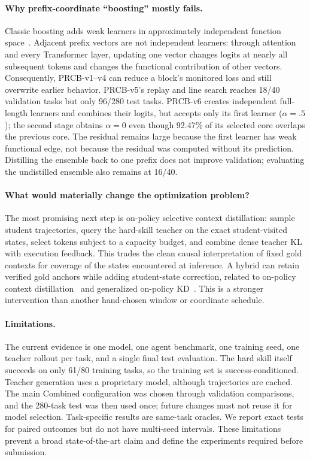 \paragraph{Why prefix-coordinate ``boosting'' mostly fails.}
Classic boosting adds weak learners in approximately independent function space~\citep{friedman2001greedy}.  Adjacent prefix vectors are not independent learners: through attention and every Transformer layer, updating one vector changes logits at nearly all subsequent tokens and changes the functional contribution of other vectors.  Consequently, PRCB-v1--v4 can reduce a block's monitored loss and still overwrite earlier behavior.  PRCB-v5's replay and line search reaches 18/40 validation tasks but only 96/280 test tasks.  PRCB-v6 creates independent full-length learners and combines their logits, but accepts only its first learner ($\alpha=.5$); the second stage obtains $\alpha=0$ even though 92.47\% of its selected core overlaps the previous core.  The residual remains large because the first learner has weak functional edge, not because the residual was computed without its prediction.  Distilling the ensemble back to one prefix does not improve validation; evaluating the undistilled ensemble also remains at 16/40.

\paragraph{What would materially change the optimization problem?}
The most promising next step is on-policy selective context distillation: sample student trajectories, query the hard-skill teacher on the exact student-visited states, select tokens subject to a capacity budget, and combine dense teacher KL with execution feedback.  This trades the clean causal interpretation of fixed gold contexts for coverage of the states encountered at inference.  A hybrid can retain verified gold anchors while adding student-state correction, related to on-policy context distillation~\citep{ye2026opcd} and generalized on-policy KD~\citep{agarwal2024gkd}.  This is a stronger intervention than another hand-chosen window or coordinate schedule.

\paragraph{Limitations.}
The current evidence is one model, one agent benchmark, one training seed, one teacher rollout per task, and a single final test evaluation.  The hard skill itself succeeds on only 61/80 training tasks, so the training set is success-conditioned.  Teacher generation uses a proprietary model, although trajectories are cached.  The main Combined configuration was chosen through validation comparisons, and the 280-task test was then used once; future changes must not reuse it for model selection.  Task-specific results are same-task oracles.  We report exact tests for paired outcomes but do not have multi-seed intervals.  These limitations prevent a broad state-of-the-art claim and define the experiments required before submission.
